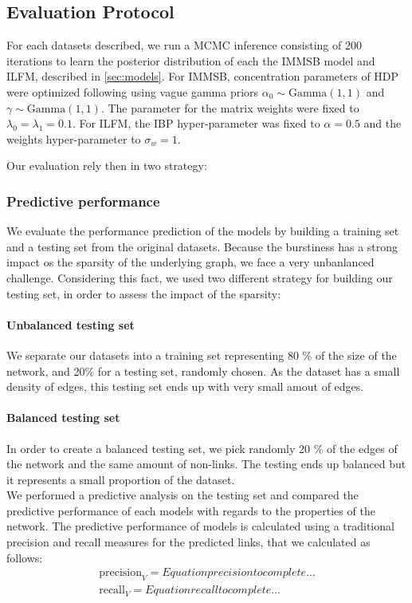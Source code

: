 \subsection{Evaluation Protocol}
For each datasets described,  we run a MCMC inference consisting of 200 iterations to learn the posterior distribution of each the IMMSB model and ILFM, described in \ref{sec:models}. For IMMSB, concentration parameters of HDP were optimized following \cite{HDP} using vague gamma priors $\alpha_0 \sim \text{Gamma}(1,1)$ and $\gamma \sim \text{Gamma}(1,1)$. The parameter for the matrix weights were fixed to $\lambda_0=\lambda_1=0.1$. For ILFM, the IBP hyper-parameter was fixed to $\alpha=0.5$ and the weights hyper-parameter to $\sigma_w = 1$.

Our evaluation rely then in two strategy:


\subsubsection{Predictive performance}
We evaluate the performance prediction of the models by building a training set and a testing set from the original datasets. Because the burstiness has a strong impact os the sparsity of the underlying graph, we face a very unbanlanced challenge. Considering this fact, we used two different strategy for building our testing set, in order to assess the impact of the sparsity:

\paragraph{Unbalanced testing set}
We separate our datasets into a training set representing 80 \% of the size of the network, and 20\% for a testing set, randomly chosen. As the dataset has a small density of edges, this testing set ends up with very small amout of edges.

\paragraph{Balanced testing set}
In order to create a balanced testing set, we pick randomly 20 \% of the edges of the network and the same amount of non-links. The testing ends up balanced but it represents a small proportion of the dataset.~\\


We performed a predictive analysis on the testing set and compared the predictive performance of each models with regards to the properties of the network. 
The predictive performance of models is calculated using a traditional precision and recall measures for the predicted links, that we calculated as follows:\\
\begin{align}
    \mathrm{precision}_{V} = Equation precision to complete... \\
    \mathrm{recall}_{V} = Equation recall to complete...
\end{align}


